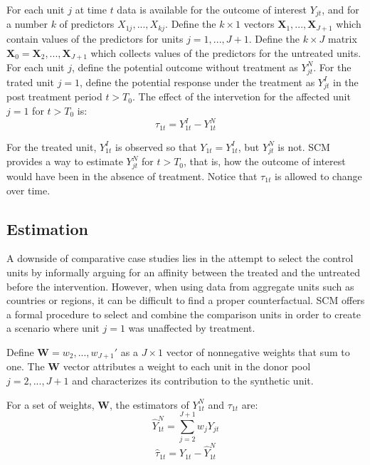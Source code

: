\documentclass[12pt,a4paper,draft]{article}
\begin{document}
For each unit $j$ at time $t$ data is available for the outcome of interest 
$Y_{jt}$, and for a number $k$ of predictors $X_{1j}, ..., X_{kj}$. Define the 
$k \times 1$ vectors $\mathbf{X}_1, ..., \mathbf{X}_{J+1}$ which contain values
of the predictors for units $j=1,...,J+1$. Define the $k \times J$ matrix 
$\mathbf{X}_0={\mathbf{X}_2,..., \mathbf{X}_{J+1}}$ which collects values of the predictors 
for the untreated units.
For each unit $j$, define the potential outcome without treatment as $Y_{jt}^N$.
For the trated unit $j=1$, define the potential response under the treatment as 
$Y_{jt}^I$ in the post treatment period $t>T_0$. The effect of the intervetion 
for the affected unit $j=1$ for $t>T_0$ is: 
$$\tau_{1t}=Y_{1t}^I-Y_{1t}^N$$

For the treated unit, $Y_{1t}^I$ is observed so that  $Y_{1t}=Y_{1t}^I$, but $Y_{jt}^N$ is not. 
SCM provides a way to estimate $Y_{jt}^N$ for $t>T_0$, that is, how the outcome 
of interest would have been in the absence of treatment. Notice that $\tau_{1t}$
is allowed to change over time.

\subsection{Estimation}
A downside of comparative case studies lies in the attempt to select the control 
units by informally arguing for an affinity between the treated and the untreated 
before the intervention. However, when using data from aggregate units such as 
countries or regions, it can be difficult to find a proper counterfactual.
SCM offers a formal procedure to select and combine the comparison units in order
to create a scenario where unit $j=1$ was unaffected by treatment.

Define $\mathbf{W}=w_2,...,w_{J+1}'$ as a $J\times 1$ vector of nonnegative weights
that sum to one. 
The $\mathbf{W}$ vector attributes a weight to each unit in the donor pool 
$j=2,...,J+1$ and characterizes its contribution to the synthetic unit. 

For a set of weights, $\mathbf{W}$, the estimators of $Y_{1t}^N$ and $\tau_{1t}$ are:
$$ \hat{Y}_{1t}^N = \sum_{j=2}^{J+1} {w_jY_{jt}} $$
$$ \hat{\tau}_{1t}=Y_{1t}- \hat{Y}_{1t}^N$$
\end{document}
